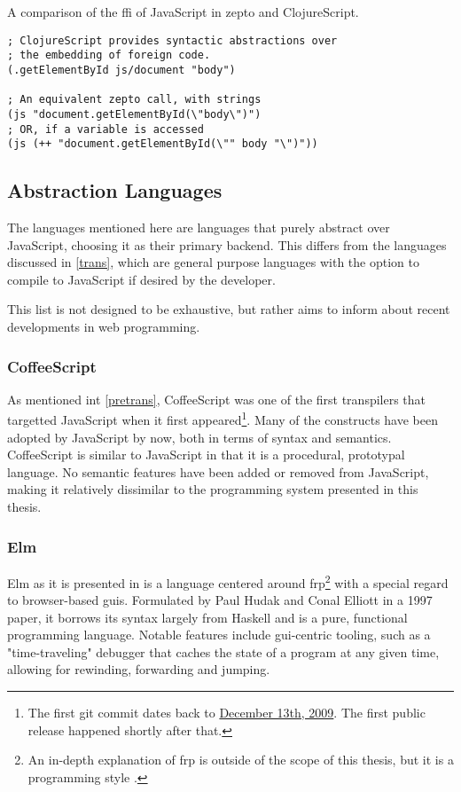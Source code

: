 \documentclass[oneside,11pt,xetex]{scrbook}
\begin{document}
\begin{listing}[H]
\caption{A comparison of the \gls{ffi} of JavaScript in zepto and ClojureScript.}
\begin{verbatim}
; ClojureScript provides syntactic abstractions over
; the embedding of foreign code.
(.getElementById js/document "body")

; An equivalent zepto call, with strings
(js "document.getElementById(\"body\")")
; OR, if a variable is accessed
(js (++ "document.getElementById(\"" body "\")"))
\end{verbatim}
\end{listing}

\subsection{Abstraction Languages}

The languages mentioned here are languages that purely abstract over JavaScript,
choosing it as their primary backend. This differs from the languages discussed
in \ref{trans}, which are general purpose languages with the option to compile
to JavaScript if desired by the developer.

This list is not designed to be exhaustive, but rather aims to inform about
recent developments in web programming.

\subsubsection{CoffeeScript}

As mentioned int \ref{pretrans}, CoffeeScript was one of the first transpilers
that targetted JavaScript when it first appeared\footnote{The first git commit
dates back to
\href{https://github.com/jashkenas/coffeescript/commit/8e9d637985d2dc9b44922076ad54ffef7fa8e9c2}{December 13th, 2009}.
The first public release happened shortly after that.}. Many of the constructs
have been adopted by JavaScript by now, both in terms of syntax and semantics.
CoffeeScript is similar to JavaScript in that it is a procedural, prototypal
language. No semantic features have been added or removed from JavaScript,
making it relatively dissimilar to the programming system presented in this
thesis.

\subsubsection{Elm}

Elm as it is presented in \parencite{CPL} is a language centered around
\gls{frp}\footnote{An in-depth explanation of \gls{frp} is outside of
the scope of this thesis, but it is a programming style \parencite{frp}.}
with a special regard to browser-based \glspl{gui}. Formulated by Paul Hudak
and Conal Elliott in a 1997 paper, it borrows
its syntax largely from Haskell and is a pure, functional programming
language. Notable features include \gls{gui}-centric tooling, such
as a "time-traveling" debugger that caches the state of a program
at any given time, allowing for rewinding, forwarding and jumping.
\end{document}
